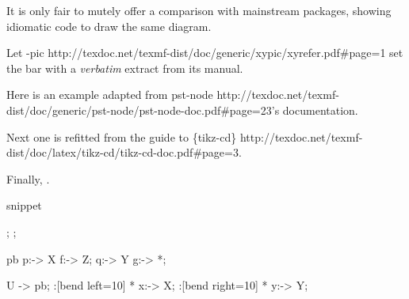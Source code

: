 It is only fair to mutely offer a comparison with mainstream packages,
showing idiomatic code to draw the same diagram.

Let \NiceURL
  {\Xy-pic}
  {http://texdoc.net/texmf-dist/doc/generic/xypic/xyrefer.pdf\#page=1}
set the bar with a \emph{verbatim} extract from its manual.



Here is an example adapted from \NiceURL
  {\ttfamily\small pst-node}
  {http://texdoc.net/texmf-dist/doc/generic/pst-node/pst-node-doc.pdf\#page=23}'s
documentation.



Next one is refitted from the guide to \NiceURL
  {\ttfamily\small\{tikz-cd\}}
  {http://texdoc.net/texmf-dist/doc/latex/tikz-cd/tikz-cd-doc.pdf\#page=3}.



Finally, \textbf{\koDi}.

\begin{tcblisting}{snippet}
\begin{kodi}[tetragonal]
  ;
  ;

  \mor[swap] pb p:-> X f:-> Z;
  \mor        * q:-> Y g:-> *;

  \mor                       U   -> pb;
  \mor      :[bend left=10]  * x:-> X;
  \mor[swap]:[bend right=10] * y:-> Y;
\end{kodi}
\end{tcblisting}
